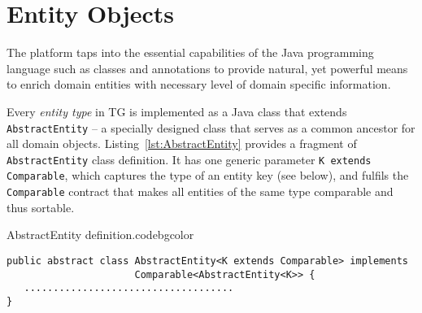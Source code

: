 \section{Entity Objects}

  The platform taps into the essential capabilities of the Java programming language such as classes and annotations to provide natural, yet powerful means to enrich domain entities with necessary level of domain specific information.  

  Every \emph{entity type} in TG is implemented as a Java class that extends \texttt{AbstractEntity} -- a specially designed class that serves as a common ancestor for all domain objects.
  Listing~\ref{lst:AbstractEntity} provides a fragment of \texttt{AbstractEntity} class definition.
  It has one generic parameter \texttt{K extends Comparable}, which captures the type of an entity key (see below), and fulfils the \texttt{Comparable} contract that makes all entities of the same type comparable and thus sortable.
  
  \begin{code}{AbstractEntity definition.}{\label{lst:AbstractEntity}}{codebgcolor}
    \begin{lstlisting}
public abstract class AbstractEntity<K extends Comparable> implements 
                      Comparable<AbstractEntity<K>> {
   ....................................
}
    \end{lstlisting}
  \end{code}


